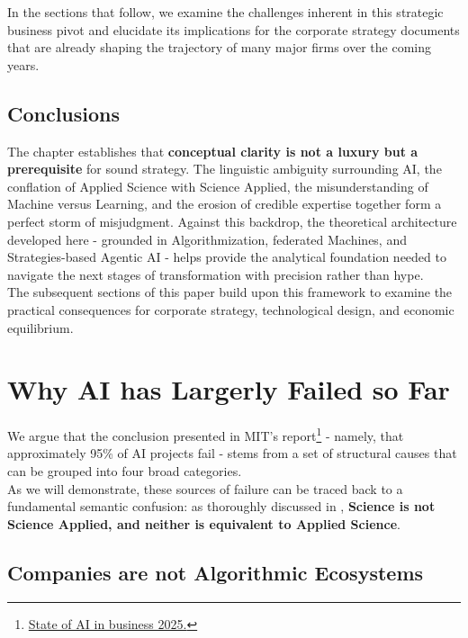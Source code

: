 \documentclass{article}
\begin{document}
In the sections that follow, we examine the challenges inherent in this strategic business pivot and elucidate its implications for the corporate strategy documents that are already shaping the trajectory of many major firms over the coming years.\\


\subsection{Conclusions}
\label{subsection: Conclusions 3}

The chapter establishes that \textbf{conceptual clarity is not a luxury but a prerequisite} for sound strategy. The linguistic ambiguity surrounding AI, the conflation of Applied Science with Science Applied, the misunderstanding of Machine versus Learning, and the erosion of credible expertise together form a perfect storm of misjudgment. Against this backdrop, the theoretical architecture developed here - grounded in Algorithmization, federated Machines, and Strategies-based Agentic AI - helps provide the analytical foundation needed to navigate the next stages of transformation with precision rather than hype.\\

The subsequent sections of this paper build upon this framework to examine the practical consequences for corporate strategy, technological design, and economic equilibrium.\\


\section{Why AI has Largerly Failed so Far}
\label{section: Why AI has Largerly Failed so Far}
We argue that the conclusion presented in MIT’s report\footnote{\href{https://www.artificialintelligence-news.com/wp-content/uploads/2025/08/ai_report_2025.pdf}{State of AI in business 2025.}} - namely, that approximately 95\% of AI projects fail - stems from a set of structural causes that can be grouped into four broad categories.\\

As we will demonstrate, these sources of failure can be traced back to a fundamental semantic confusion: as thoroughly discussed in \cite{Advances in AI}, \textbf{Science is not Science Applied, and neither is equivalent to Applied Science}.\\


\subsection{Companies are not Algorithmic Ecosystems}
\label{subsection: Companies are not Algorithmic Ecosystems}
\end{document}
